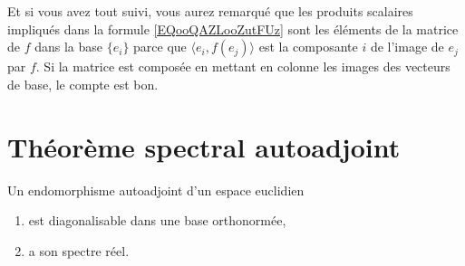 Et si vous avez tout suivi, vous aurez remarqué que les produits scalaires impliqués dans la formule \eqref{EQooQAZLooZutFUz} sont les éléments de la matrice de \( f\) dans la base \( \{ e_i \}\) parce que \( \langle e_i, f(e_j)\rangle \) est la composante \( i\) de l'image de \( e_j\) par \( f\). Si la matrice est composée en mettant en colonne les images des vecteurs de base, le compte est bon.

\section{Théorème spectral autoadjoint}

\begin{theorem} \label{ThoRSBahHH}
	Un endomorphisme autoadjoint d'un espace euclidien
	\begin{enumerate}
		\item
		      est diagonalisable dans une base orthonormée,
		\item
		      a son spectre réel.
	\end{enumerate}
\end{theorem}

